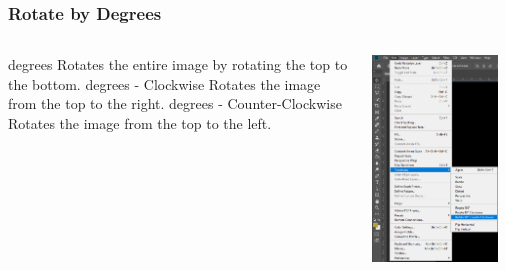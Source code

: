 \documentclass{beamer}
\begin{document}
\begin{frame}
	\frametitle{Rotate by Degrees}
		\begin{columns}
		\vspace{-25pt}
	\begin{outline}
		 degrees
		\2 Rotates the entire image by rotating the top to the bottom.
		 degrees - Clockwise
		\2 Rotates the image from the top to the right.
		 degrees - Counter-Clockwise
		\2 Rotates the image from the top to the left.
\end{outline}
		\includegraphics[width = 0.9\textwidth]{images/rotate by degrees.png}
	\end{columns}
\end{frame}
\end{document}
